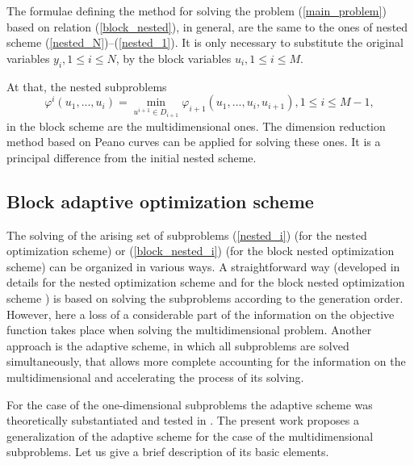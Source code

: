 \documentclass[runningheads]{llncs}
\begin{document}
The formulae defining the method for solving the problem (\ref{main_problem}) 
based on relation (\ref{block_nested}), in general, are the same to the ones 
of nested scheme (\ref{nested_N})--(\ref{nested_1}). It is only necessary to 
substitute the original variables $y_i, 1\leq i \leq N$,  by the block 
variables $u_i, 1\leq i \leq M$. 

At that, the nested subproblems 
\begin{equation}\label{block_nested_i}
\varphi^i(u_1,...,u_i) = \min_{u^{i+1}\in D_{i+1}} \varphi_{i+1}(u_1,...,u_i,u
_{i+1}), 1\leq i\leq M-1,
\end{equation}
in the block scheme are the multidimensional ones. The dimension reduction 
method based on Peano curves can be applied for solving these ones. It is a 
principal difference from the initial nested scheme. 

\subsection{Block adaptive optimization scheme}

The solving of the arising set of subproblems (\ref{nested_i}) (for the nested optimization scheme) or 
(\ref{block_nested_i}) (for the block nested optimization scheme) can be organized in various ways. 
A straightforward way (developed in details for the nested optimization scheme \cite{Grishagin2015,Grishagin2001} 
and for the block nested optimization scheme \cite{Barkalov2016,Barkalov2014}) is based on solving the 
subproblems according to the generation order. However, here a loss of a considerable part of the information 
on the objective function takes place when solving the multidimensional problem. Another approach is the adaptive 
scheme, in which all subproblems are solved simultaneously, that allows more complete accounting for the information on 
the multidimensional and accelerating the process of its solving.

For the case of the one-dimensional subproblems the adaptive scheme was theoretically substantiated and tested in 
\cite{Grishagin2016,Grishagin2016_1,Grishagin2018}. The present work proposes a generalization of the adaptive 
scheme for the case of the multidimensional subproblems. Let us give a brief description of its basic elements.
\end{document}
